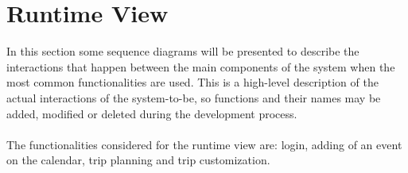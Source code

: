 \section{Runtime View}
In this section some sequence diagrams will be presented to describe the interactions that happen between the main components of the system when the most common functionalities are used. This is a high-level description of the actual interactions of the system-to-be, so functions and their names may be added, modified or deleted during the development process.
\\
\\
The functionalities considered for the runtime view are: login, adding of an event on the calendar, trip planning and trip customization.

\pagebreak
\begin{landscape}
\begin{center}
\thispagestyle{empty}
\end{center}
\end{landscape}

\pagebreak
\begin{landscape}
\begin{center}
\thispagestyle{empty}
\end{center}
\end{landscape}

